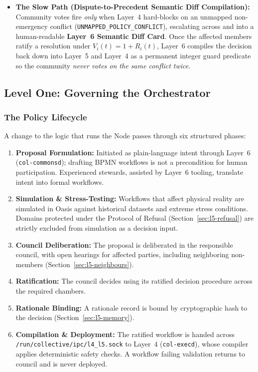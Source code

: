 \begin{enumerate}
\begin{itemize}
    \item \textbf{The Slow Path (Dispute-to-Precedent Semantic Diff Compilation):} Community votes fire \textit{only} when Layer~4 hard-blocks on an unmapped non-emergency conflict (\texttt{UNMAPPED\_POLICY\_CONFLICT}), escalating across  and  into a human-readable \textbf{Layer~6 Semantic Diff Card}. Once the affected members ratify a resolution under $V_i(t) = 1 + R_i(t)$, Layer~6 compiles the decision back down into Layer~5 and Layer~4 as a permanent integer guard predicate so the community \textit{never votes on the same conflict twice}.
  \end{itemize}
\end{enumerate}

\subsection{Level One: Governing the Orchestrator}
\label{subsec:l5-level-one}

\subsubsection{The Policy Lifecycle}

A change to the logic that runs the Node passes through six structured phases:
\begin{enumerate}
  \item \textbf{Proposal Formulation:} Initiated as plain-language intent through Layer~6 (\texttt{col-commonsd}); drafting BPMN workflows is not a precondition for human participation. Experienced stewards, assisted by Layer~6 tooling, translate intent into formal workflows.
  \item \textbf{Simulation \& Stress-Testing:} Workflows that affect physical reality are simulated in Oasis against historical datasets and extreme stress conditions. Domains protected under the Protocol of Refusal (Section~\ref{sec:l5-refusal}) are strictly excluded from simulation as a decision input.
  \item \textbf{Council Deliberation:} The proposal is deliberated in the responsible council, with open hearings for affected parties, including neighboring non-members (Section~\ref{sec:l5-neighbours}).
  \item \textbf{Ratification:} The council decides using its ratified decision procedure across the required chambers.
  \item \textbf{Rationale Binding:} A rationale record is bound by cryptographic hash to the decision (Section~\ref{sec:l5-memory}).
  \item \textbf{Compilation \& Deployment:} The ratified workflow is handed across \texttt{/run/collective/ipc/l4\_l5.sock} to Layer~4 (\texttt{col-execd}), whose compiler applies deterministic safety checks. A workflow failing validation returns to council and is never deployed.
\end{enumerate}

